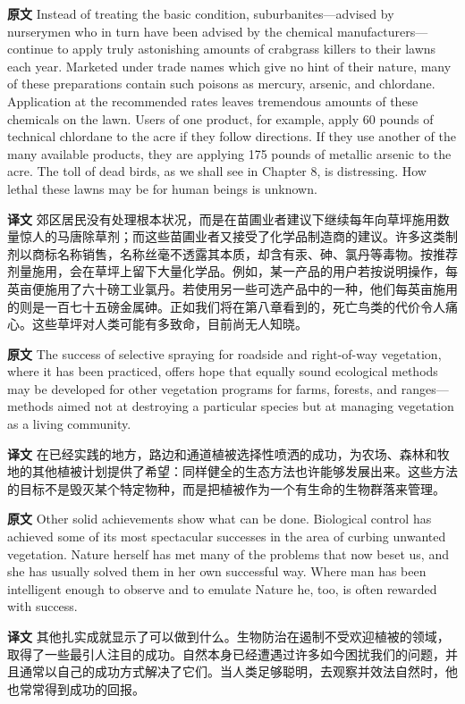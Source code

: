 \documentclass[UTF8,zihao=-4]{ctexart}
\begin{document}
\noindent\textbf{原文} Instead of treating the basic condition, suburbanites---advised by nurserymen who in turn have been advised by the chemical manufacturers---continue to apply truly astonishing amounts of crabgrass killers to their lawns each year. Marketed under trade names which give no hint of their nature, many of these preparations contain such poisons as mercury, arsenic, and chlordane. Application at the recommended rates leaves tremendous amounts of these chemicals on the lawn. Users of one product, for example, apply 60 pounds of technical chlordane to the acre if they follow directions. If they use another of the many available products, they are applying 175 pounds of metallic arsenic to the acre. The toll of dead birds, as we shall see in Chapter 8, is distressing. How lethal these lawns may be for human beings is unknown.
\par
\noindent\textbf{译文} 郊区居民没有处理根本状况，而是在苗圃业者建议下继续每年向草坪施用数量惊人的马唐除草剂；而这些苗圃业者又接受了化学品制造商的建议。许多这类制剂以商标名称销售，名称丝毫不透露其本质，却含有汞、砷、氯丹等毒物。按推荐剂量施用，会在草坪上留下大量化学品。例如，某一产品的用户若按说明操作，每英亩便施用了六十磅工业氯丹。若使用另一些可选产品中的一种，他们每英亩施用的则是一百七十五磅金属砷。正如我们将在第八章看到的，死亡鸟类的代价令人痛心。这些草坪对人类可能有多致命，目前尚无人知晓。
\par\medskip

\noindent\textbf{原文} The success of selective spraying for roadside and right-of-way vegetation, where it has been practiced, offers hope that equally sound ecological methods may be developed for other vegetation programs for farms, forests, and ranges---methods aimed not at destroying a particular species but at managing vegetation as a living community.
\par
\noindent\textbf{译文} 在已经实践的地方，路边和通道植被选择性喷洒的成功，为农场、森林和牧地的其他植被计划提供了希望：同样健全的生态方法也许能够发展出来。这些方法的目标不是毁灭某个特定物种，而是把植被作为一个有生命的生物群落来管理。
\par\medskip

\noindent\textbf{原文} Other solid achievements show what can be done. Biological control has achieved some of its most spectacular successes in the area of curbing unwanted vegetation. Nature herself has met many of the problems that now beset us, and she has usually solved them in her own successful way. Where man has been intelligent enough to observe and to emulate Nature he, too, is often rewarded with success.
\par
\noindent\textbf{译文} 其他扎实成就显示了可以做到什么。生物防治在遏制不受欢迎植被的领域，取得了一些最引人注目的成功。自然本身已经遭遇过许多如今困扰我们的问题，并且通常以自己的成功方式解决了它们。当人类足够聪明，去观察并效法自然时，他也常常得到成功的回报。
\par\medskip
\end{document}

